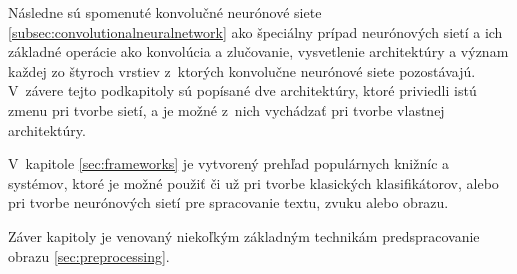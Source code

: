 Následne sú spomenuté konvolučné neurónové siete \ref{subsec:convolutionalneuralnetwork} ako špeciálny prípad neurónových sietí a ich základné operácie ako konvolúcia a zlučovanie,
    vysvetlenie architektúry a význam každej zo štyroch vrstiev z~ktorých konvolučne neurónové siete pozostávajú.
V~závere tejto podkapitoly sú popísané dve architektúry, ktoré priviedli istú zmenu pri tvorbe sietí, a je možné z~nich vychádzať pri tvorbe vlastnej architektúry.

V~kapitole \ref{sec:frameworks} je vytvorený prehľad populárnych knižníc a systémov, ktoré je možné použiť či už pri tvorbe klasických klasifikátorov, alebo
    pri tvorbe neurónových sietí pre spracovanie textu, zvuku alebo obrazu.

Záver kapitoly je venovaný niekoľkým základným technikám predspracovanie obrazu \ref{sec:preprocessing}.
